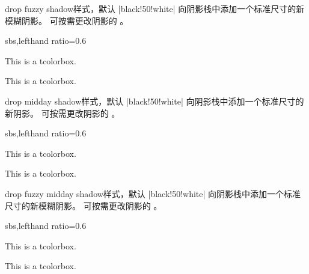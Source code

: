 \begin{docTcbKey}{drop fuzzy shadow}{}{样式，默认 |black!50!white|}
  向阴影栈中添加一个标准尺寸的新模糊阴影。
  可按需更改阴影的 。
\begin{dispExample*}{sbs,lefthand ratio=0.6}

\begin{tcolorbox}
This is a tcolorbox.
\end{tcolorbox}\par\bigskip
\begin{tcolorbox}[title=Another shadow,
  drop fuzzy shadow=blue]
This is a tcolorbox.
\end{tcolorbox}
\end{dispExample*}
\end{docTcbKey}


\begin{docTcbKey}{drop midday shadow}{}{样式，默认 |black!50!white|}
  向阴影栈中添加一个标准尺寸的新阴影。
  可按需更改阴影的 。
\begin{dispExample*}{sbs,lefthand ratio=0.6}

\begin{tcolorbox}
This is a tcolorbox.
\end{tcolorbox}\par\bigskip
\begin{tcolorbox}[title=Another shadow,
  drop midday shadow=blue]
This is a tcolorbox.
\end{tcolorbox}
\end{dispExample*}
\end{docTcbKey}

\begin{docTcbKey}{drop fuzzy midday shadow}{}{样式，默认 |black!50!white|}
  向阴影栈中添加一个标准尺寸的新模糊阴影。
  可按需更改阴影的 。
\begin{dispExample*}{sbs,lefthand ratio=0.6}

\begin{tcolorbox}
This is a tcolorbox.
\end{tcolorbox}\par\bigskip
\begin{tcolorbox}[title=Another shadow,
  drop fuzzy midday shadow=blue]
This is a tcolorbox.
\end{tcolorbox}
\end{dispExample*}
\end{docTcbKey}


